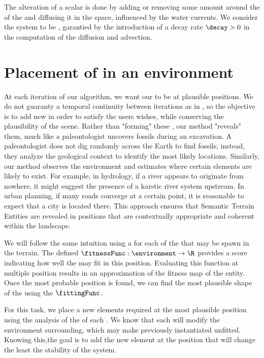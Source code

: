 The alteration of a scalar  is done by adding or removing some amount around the  of the  and diffusing it in the space, influenced by the water currents. We consider the system to be , garantied by the introduction of a decay rate $\decay > 0$ in the computation of the diffusion and advection.



\section{Placement of  in an environment}
\label{sec:semantic-representation_generation-rules}

At each iteration of our algorithm, we want our  to be at plausible positions. We do not guaranty a temporal continuity between iterations as in \citep{Ecormier-Nocca2021}, so the objective is to add new  in order to satisfy the users wishes, while conserving the plausibility of the scene. Rather than "forming" these , our method "reveals" them, much like a paleontologist uncovers fossils during an excavation. A paleontologist does not dig randomly across the Earth to find fossils; instead, they analyze the geological context to identify the most likely locations. Similarly, our method observes the environment and estimates where certain elements are likely to exist. For example, in hydrology, if a river appears to originate from nowhere, it might suggest the presence of a karstic river system upstream. In urban planning, if many roads converge at a certain point, it is reasonable to expect that a city is located there. This approach ensures that Semantic Terrain Entities are revealed in positions that are contextually appropriate and coherent within the landscape.

We will follow the same intuition using a  for each of the  that may be spawn in the terrain. The  defined $\fitnessFunc: \environment \to \R$ provides a score indicating how well the  may fit in this position. Evaluating this function at multiple position results in an approximation of the fitness map of the entity. Once the most probable position is found, we can find the most plausible shape of the  using the  $\fittingFunc$.

For this task, we place a new elements required at the most plausible position using the analysis of the  of each . We know that each  will modify the environment surrounding, which may make previously instantiated  unfitted. Knowing this,the goal is to add the new element at the position that will change the least the stability of the system. 


